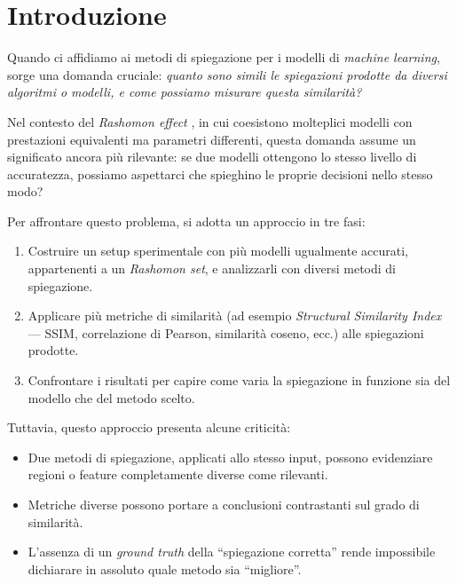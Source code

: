 \documentclass[12pt,a4paper,oneside]{report}
\numberwithin{figure}{chapter}
\numberwithin{table}{chapter}
\begin{document}
\tableofcontents

\newpage

\maketitle

\chapter{Introduzione}

Quando ci affidiamo ai metodi di spiegazione per i modelli di \emph{machine
      learning}, sorge una domanda cruciale: \textit{quanto sono simili le
      spiegazioni prodotte da diversi algoritmi o modelli, e come possiamo misurare
      questa similarità?}

Nel contesto del \emph{Rashomon effect}
\cite{mueller2023rashomon,leventi2023consistency}, in cui coesistono molteplici
modelli con prestazioni equivalenti ma parametri differenti, questa domanda
assume un significato ancora più rilevante: se due modelli ottengono lo stesso
livello di accuratezza, possiamo aspettarci che spieghino le proprie decisioni
nello stesso modo?

Per affrontare questo problema, si adotta un approccio in tre fasi:
\begin{enumerate}
      \item Costruire un setup sperimentale con più modelli ugualmente accurati,
            appartenenti a un \emph{Rashomon set}, e analizzarli con diversi metodi di
            spiegazione.
      \item Applicare più metriche di similarità (ad esempio \emph{Structural Similarity
                  Index} — SSIM, correlazione di Pearson, similarità coseno, ecc.) alle
            spiegazioni prodotte.
      \item Confrontare i risultati per capire come varia la spiegazione in funzione sia
            del modello che del metodo scelto.
\end{enumerate}

Tuttavia, questo approccio presenta alcune criticità:
\begin{itemize}
      \item Due metodi di spiegazione, applicati allo stesso input, possono evidenziare
            regioni o feature completamente diverse come rilevanti.
      \item Metriche diverse possono portare a conclusioni contrastanti sul grado di
            similarità.
      \item L’assenza di un \emph{ground truth} della “spiegazione corretta” rende
            impossibile dichiarare in assoluto quale metodo sia “migliore”.
\end{itemize}
\end{document}
